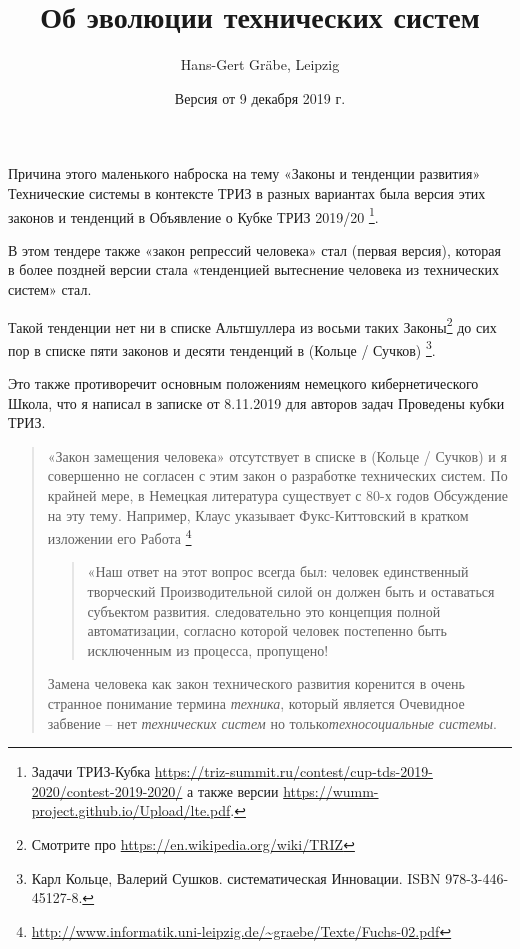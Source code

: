 \documentclass[11pt,a4paper]{article}
\title{Об эволюции технических систем}
\author{Hans-Gert Gräbe, Leipzig}
\date{Версия от 9 декабря 2019 г.}
\begin{document}
\maketitle

Причина этого маленького наброска на тему «Законы и тенденции развития»
Технические системы в контексте ТРИЗ в разных вариантах была версия этих
законов и тенденций в Объявление о Кубке ТРИЗ 2019/20 \footnote{\raggedright
  Задачи ТРИЗ-Кубка
  \url{https://triz-summit.ru/contest/cup-tds-2019-2020/contest-2019-2020/} а
  также версии \url{https://wumm-project.github.io/Upload/lte.pdf}. }.

В этом тендере также «закон репрессий человека» стал (первая версия), которая
в более поздней версии стала «тенденцией вытеснение человека из технических
систем» стал.

Такой тенденции нет ни в списке Альтшуллера из восьми таких
Законы\footnote{Смотрите про \url{https://en.wikipedia.org/wiki/TRIZ}} до сих
пор в списке пяти законов и десяти тенденций в (Кольце /
Сучков) \footnote{Карл Кольце, Валерий Сушков. систематическая Инновации. ISBN
  978-3-446-45127-8.}.

Это также противоречит основным положениям немецкого кибернетического Школа,
что я написал в записке от 8.11.2019 для авторов задач Проведены кубки ТРИЗ.
\begin{quote}
  «Закон замещения человека» отсутствует в списке в (Кольце / Сучков) и я
  совершенно не согласен с этим закон о разработке технических систем. По
  крайней мере, в Немецкая литература существует с 80-х годов Обсуждение на
  эту тему. Например, Клаус указывает Фукс-Киттовский в кратком изложении его
  Работа \footnote{\url{http://www.informatik.uni-leipzig.de/~graebe/Texte/Fuchs-02.pdf}}
  \begin{quote}
    «Наш ответ на этот вопрос всегда был: человек единственный творческий
    Производительной силой он должен быть и оставаться субъектом
    развития. следовательно это концепция полной автоматизации, согласно
    которой человек постепенно быть исключенным из процесса, пропущено!
  \end{quote}
  Замена человека как закон технического развития коренится в очень странное
  понимание термина \emph{техника}, который является Очевидное забвение -- нет
  \emph{технических систем} но только\emph {техносоциальные системы}.
\end{quote}
\end{document}
